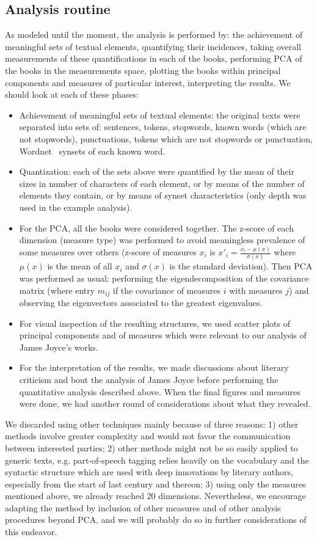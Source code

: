 \documentclass[12pt,fleqn]{article}
\begin{document}
\subsection{Analysis routine}
As modeled until the moment, the analysis is performed by: the achievement of meaningful sets of textual elements,
quantifying their incidences, taking overall measurements of these quantifications in each of the books,  
performing PCA of the books in the measurements space, plotting the books within principal components
and measures of particular interest, interpreting the results.
We should look at each of these phases:
\begin{itemize}
    \item Achievement of meaningful sets of textual elements: the original texts were separated into sets of: sentences, tokens, stopwords, known words (which are not stopwords), punctuations, tokens which are not stopwords or punctuation, Wordnet~\citep{wordnet} synsets of each known word.
    \item Quantization: each of the sets above were quantified by the mean of their sizes in number of characters of each element, or by means of the number of elements they contain, or by means of synset characteristics (only depth was used in the example analysis).
    \item For the PCA, all the books were considered together. The z-score of each dimension (measure type) was performed to avoid meaningless prevalence of some measures over others (z-score of measures $x_i$ is $x'_i = \frac{x_i-\mu(x)}{\sigma(x)}$ where $\mu(x)$ is the mean of all $x_i$ and $\sigma(x)$ is the standard deviation). Then PCA was performed as usual: performing the eigendecomposition of the covariance matrix (where entry $m_{ij}$ if the covariance of measures $i$ with measures $j$) and observing the eigenvectors associated to the greatest eigenvalues.
    \item For visual inspection of the resulting structures, we used scatter plots of principal components and of measures which were relevant to our analysis of James Joyce's works.
    \item For the interpretation of the results, we made discussions about literary criticism and bout the analysis of James Joyce before performing the quantitative analysis described above.
        When the final figures and measures were done, we had another round of considerations about what they revealed.
\end{itemize}

We discarded using other techniques mainly because of three reasons:
1) other methods involve greater complexity and would not favor the communication between interested parties;
2) other methods might not be so easily applied to generic texts,
e.g. part-of-speech tagging relies heavily on the vocabulary and the syntactic structure
which are used with deep innovations by literary authors, especially from the start of last century and thereon;
3) using only the measures mentioned above, we already reached 20 dimensions.
Nevertheless, we encourage adapting the method by inclusion of other measures and of other analysis procedures beyond PCA,
and we will probably do so in further considerations of this endeavor.
\end{document}
